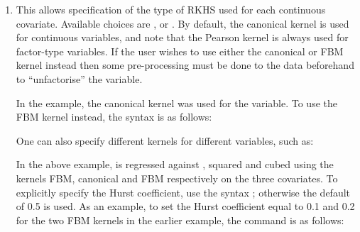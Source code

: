 \begin{enumerate}

\item {}

This allows specification of the type of RKHS used for each continuous covariate. Available choices are ,  or . By default, the canonical kernel is used for continuous variables, and note that the Pearson kernel is always used for factor-type variables. If the user wishes to use either the canonical or FBM kernel instead then some pre-processing must be done to the data beforehand to ``unfactorise'' the variable.

In the  example, the canonical kernel was used for the  variable. To use the FBM kernel instead, the syntax is as follows:

\begin{knitrout}
\color{fgcolor}\begin{kframe}
\begin{alltt}
 \hlkwb{<-}  \hlopt{~}  \hlopt{+}   
                   \hlstd{=} \hlstd{(} \hlstd{=} \hlstd{))}
\end{alltt}
\end{kframe}
\end{knitrout}

One can also specify different kernels for different variables, such as:

\begin{knitrout}
\color{fgcolor}\begin{kframe}
\begin{alltt}
 \hlkwb{<-}  \hlopt{~}  \hlopt{+} \hlopt{^}\hlstd{)} \hlopt{+} \hlopt{^}\hlstd{),}  
                   \hlstd{=} \hlstd{(} \hlstd{=} \hlstd{(}\hlstd{,} \hlstd{,} \hlstd{)))}
\end{alltt}
\end{kframe}
\end{knitrout}

In the above example,  is regressed against ,  squared and  cubed using the kernels FBM, canonical and FBM respectively on the three covariates. To explicitly specify the Hurst coefficient, use the syntax ; otherwise the default of 0.5 is used. As an example, to set the Hurst coefficient equal to 0.1 and 0.2 for the two FBM kernels in the earlier example, the command is as follows:


\end{enumerate}
